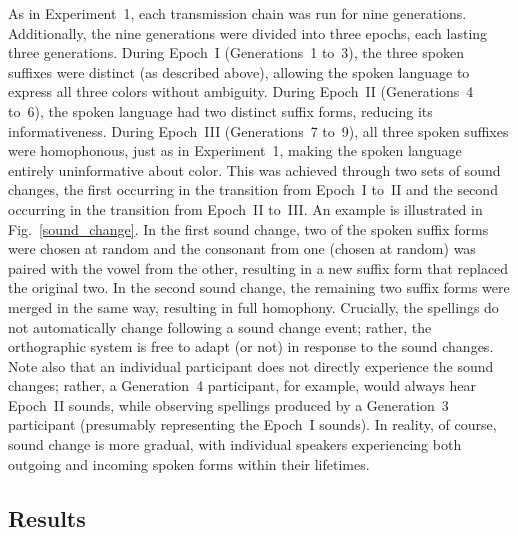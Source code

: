 \documentclass[doc,biblatex]{apa7}
\begin{document}
As in Experiment~1, each transmission chain was run for nine generations. Additionally, the nine generations were divided into three epochs, each lasting three generations. During Epoch~I (Generations~1 to~3), the three spoken suffixes were distinct (as described above), allowing the spoken language to express all three colors without ambiguity. During Epoch~II (Generations~4 to~6), the spoken language had two distinct suffix forms, reducing its informativeness. During Epoch~III (Generations~7 to~9), all three spoken suffixes were homophonous, just as in Experiment~1, making the spoken language entirely uninformative about color. This was achieved through two sets of sound changes, the first occurring in the transition from Epoch~I to~II and the second occurring in the transition from Epoch~II to~III. An example is illustrated in Fig.~\ref{sound_change}. In the first sound change, two of the spoken suffix forms were chosen at random and the consonant from one (chosen at random) was paired with the vowel from the other, resulting in a new suffix form that replaced the original two. In the second sound change, the remaining two suffix forms were merged in the same way, resulting in full homophony. Crucially, the spellings do not automatically change following a sound change event; rather, the orthographic system is free to adapt (or not) in response to the sound changes. Note also that an individual participant does not directly experience the sound changes; rather, a Generation~4 participant, for example, would always hear Epoch~II sounds, while observing spellings produced by a Generation~3 participant (presumably representing the Epoch~I sounds). In reality, of course, sound change is more gradual, with individual speakers experiencing both outgoing and incoming spoken forms within their lifetimes.

\subsection{Results}
\end{document}
